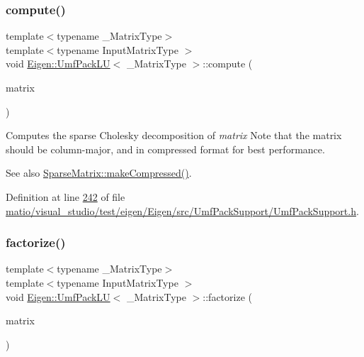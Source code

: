 \subsubsection{\texorpdfstring{compute()}{compute()}\hspace{0.1cm}{\footnotesize\ttfamily [2/2]}}
{\footnotesize\ttfamily template$<$typename \+\_\+\+Matrix\+Type$>$ \\
template$<$typename Input\+Matrix\+Type $>$ \\
void \hyperlink{class_eigen_1_1_umf_pack_l_u}{Eigen\+::\+Umf\+Pack\+LU}$<$ \+\_\+\+Matrix\+Type $>$\+::compute (\begin{DoxyParamCaption}\item[{const Input\+Matrix\+Type \&}]{matrix }\end{DoxyParamCaption})\hspace{0.3cm}{\ttfamily [inline]}}

Computes the sparse Cholesky decomposition of {\itshape matrix} Note that the matrix should be column-\/major, and in compressed format for best performance. \begin{DoxySeeAlso}{See also}
\hyperlink{group___sparse_core___module_a5ff54ffc10296f9466dc81fa888733fd}{Sparse\+Matrix\+::make\+Compressed()}. 
\end{DoxySeeAlso}


Definition at line \hyperlink{matio_2visual__studio_2test_2eigen_2_eigen_2src_2_umf_pack_support_2_umf_pack_support_8h_source_l00242}{242} of file \hyperlink{matio_2visual__studio_2test_2eigen_2_eigen_2src_2_umf_pack_support_2_umf_pack_support_8h_source}{matio/visual\+\_\+studio/test/eigen/\+Eigen/src/\+Umf\+Pack\+Support/\+Umf\+Pack\+Support.\+h}.

\mbox{\label{class_eigen_1_1_umf_pack_l_u_a1471bf890503e743c45d75cc02a5345d}} 
\subsubsection{\texorpdfstring{factorize()}{factorize()}\hspace{0.1cm}{\footnotesize\ttfamily [1/2]}}
{\footnotesize\ttfamily template$<$typename \+\_\+\+Matrix\+Type$>$ \\
template$<$typename Input\+Matrix\+Type $>$ \\
void \hyperlink{class_eigen_1_1_umf_pack_l_u}{Eigen\+::\+Umf\+Pack\+LU}$<$ \+\_\+\+Matrix\+Type $>$\+::factorize (\begin{DoxyParamCaption}\item[{const Input\+Matrix\+Type \&}]{matrix }\end{DoxyParamCaption})\hspace{0.3cm}{\ttfamily [inline]}}

